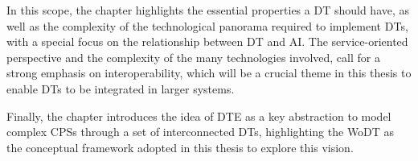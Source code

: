  In this scope, the chapter highlights the essential properties a \ac{DT} should have, as well as the complexity of the technological panorama required to implement \acp{DT}, with a special focus on the relationship between \ac{DT} and \ac{AI}.
 The service-oriented perspective and the complexity of the many technologies involved, call for a strong emphasis on interoperability, which will be a crucial theme in this thesis to enable \acp{DT} to be integrated in larger systems.

 Finally, the chapter introduces the idea of \ac{DTE} as a key abstraction to model complex \acp{CPS} through a set of interconnected \acp{DT}, highlighting the \ac{WoDT} as the conceptual framework adopted in this thesis to explore this vision.